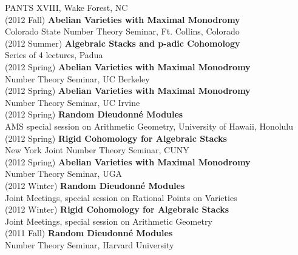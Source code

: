 \documentclass[margin,line]{res}
\begin{document}
\begin{resume}
PANTS XVIII, Wake Forest, NC 
\vspace{.05cm}\\
(2012 Fall) \textbf{Abelian Varieties with Maximal Monodromy}\\
Colorado State Number Theory Seminar, Ft. Collins, Colorado 
\vspace{.05cm}\\
(2012 Summer) \textbf{Algebraic Stacks and p-adic Cohomology}\\
Series of 4 lectures, Padua
\vspace{.05cm}\\
(2012 Spring) \textbf{Abelian Varieties with Maximal Monodromy}\\
Number Theory Seminar, UC Berkeley
\vspace{.05cm}\\
(2012 Spring) \textbf{Abelian Varieties with Maximal Monodromy}\\
Number Theory Seminar, UC Irvine
\vspace{.05cm}\\
(2012 Spring) \textbf{Random Dieudonn\'e Modules}\\
AMS special session on Arithmetic Geometry, University of Hawaii, Honolulu 
\vspace{.05cm}\\
(2012 Spring) \textbf{Rigid Cohomology for Algebraic Stacks}\\
New York Joint Number Theory Seminar, CUNY
\vspace{.05cm}\\
(2012 Spring) \textbf{Abelian Varieties with Maximal Monodromy}\\
Number Theory Seminar, UGA
\vspace{.05cm}\\
(2012 Winter) \textbf{Random Dieudonn\'e Modules}\\
Joint Meetings, special session on Rational Points on Varieties
\vspace{.05cm}\\
(2012 Winter) \textbf{Rigid Cohomology for Algebraic Stacks}\\
Joint Meetings, special session on Arithmetic Geometry
\vspace{.05cm}\\
(2011 Fall) \textbf{Random Dieudonn\'e Modules}\\
Number Theory Seminar, Harvard University

\end{resume}
\end{document}
